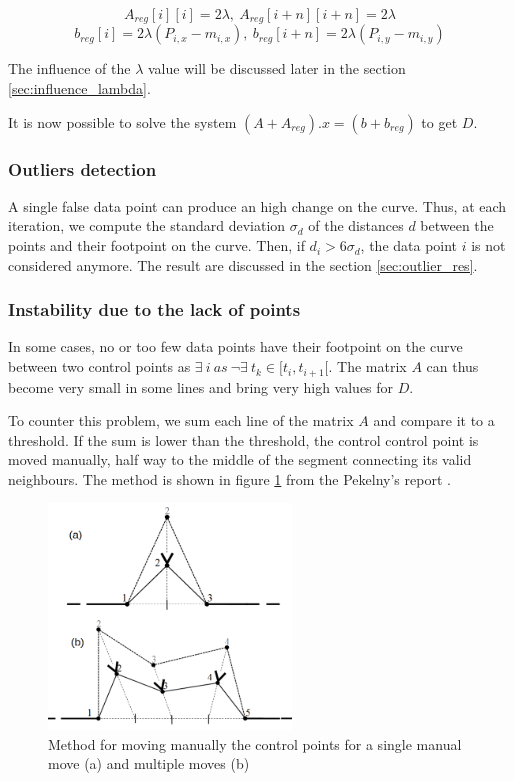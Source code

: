 \documentclass{article}
\newcommand{\vsp}{\vspace{\baselineskip}}
\begin{document}
$$ A_{reg}[i][i] = 2\lambda,\ A_{reg}[i+n][i+n] = 2\lambda $$
$$ b_{reg}[i] = 2\lambda (P_{i,x} - m_{i,x}),\ b_{reg}[i+n] = 2\lambda (P_{i,y} - m_{i,y})$$

The influence of the $\lambda$ value will be discussed later in the section \ref{sec:influence_lambda}. 

\vsp

It is now possible to solve the system $(A+A_{reg}).x=(b+b_{reg})$ to get $D$.

\subsubsection{Outliers detection}

A single false data point can produce an high change on the curve. Thus, at each iteration, we compute the standard deviation $\sigma_d$ of the distances $d$ between the points and their footpoint on the curve. Then, if $d_i > 6 \sigma_d$, the data point $i$ is not considered anymore. The result are discussed in the section \ref{sec:outlier_res}.


\subsubsection{Instability due to the lack of points}

In some cases, no or too few data points have their footpoint on the curve between two control points as $\exists\ i\ as\ \neg\exists\ t_k \in [t_i,t_{i+1}[ $. The matrix $A$ can thus become very small in some lines and bring very high values for $D$.

\vsp

To counter this problem, we sum each line of the matrix $A$ and compare it to a threshold. If the sum is lower than the threshold, the control control point is moved manually, half way to the middle of the segment connecting its valid neighbours. The method is shown in figure \ref{fig:manual_move_ctrl_pts} from the Pekelny's report \cite{pekelny_bsp}.

\begin{figure}[H]
    \centering
    \includegraphics[height = 6cm]{images/manual_move_ctrl_pts.png}
    \caption[Method for moving manually the control points]{Method for moving manually the control points for a single manual move (a) and multiple moves (b)}
    \label{fig:manual_move_ctrl_pts}
\end{figure}
\end{document}
